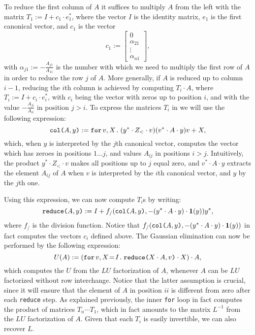 To reduce the first column of $A$ it suffices to multiply $A$ from the left with the matrix $T_1 := I + c_1\cdot e_1^*$, where the vector $I$ is the identity matrix, $e_1$ is the first canonical vector, and $c_1$ is the vector 
\[
c_1 :=
\begin{bmatrix}
    0 \\
    \alpha_{21} \\
    \vdots \\
    \alpha_{n1}
\end{bmatrix},
\]
with $\alpha_{j1} := -\frac{A_{j1}}{A_{11}}$ is the number with which we need to multiply the first row of $A$ in order to reduce the row $j$ of $A$. More generally, if $A$ is reduced up to column $i-1$, reducing the $i$th column is achieved by computing $T_i \cdot A$, where $T_i := I + c_i\cdot e_i^*$, with $c_i$ being the vector with zeros up to position $i$, and with the value $-\frac{A_{ji}}{A_{ii}}$ in position $j > i$. To express the matrices $T_i$ in \langfor we will use the following expression:
$$\ccol{A}{y} := \ffor{v}{X}{(y^*\cdot Z_{<} \cdot v)(v^*\cdot A \cdot y)v + X},$$
which, when $y$ is interpreted by the $j$th canonical vector, computes the vector which has zeroes in positions $1\ldots j$, and values $A_{ij}$ in positions $i>j$. Intuitively, the product $y^*\cdot Z_{<}\cdot v$ makes all positions up to $j$ equal zero, and $v^*\cdot A\cdot y$ extracts the element $A_{ij}$ of $A$ when $v$ is interpreted by the $i$th canonical vector, and $y$ by the $j$th one.



Using this expression, we can now compute $T_i$s by writing:
$$\red{A}{y} := I + f_/(\ccol{A}{y},-(y^*\cdot A\cdot y)\cdot \ones(y))y^*,$$
where $f_/$ is the division function. Notice that $f_/(\ccol{A}{y},-(y^*\cdot A\cdot y)\cdot \ones(y))$ in fact computes the vectors $c_i$ defined above. The Gaussian elimination can now be performed by the following expression:
$$
U(A) :=  \left( \initf{I}{v}{X}{\red{X\cdot A}{v}\cdot X} \right) \cdot A,
$$
which computes the $U$ from the $LU$ factorization of $A$, whenever $A$ can be $LU$ factorized without row interchange. Notice that the latter assumption is crucial, since it will ensure that the element of $A$ in position $ii$ is different from zero after each \texttt{reduce} step. As explained previously, the inner \texttt{for} loop in fact computes the product of matrices $T_{n}\cdots T_1$, which in fact amounts to the matrix $L^{-1}$ from the $LU$ factorization of $A$. Given that each $T_i$ is easily invertible, we can also recover $L$.

